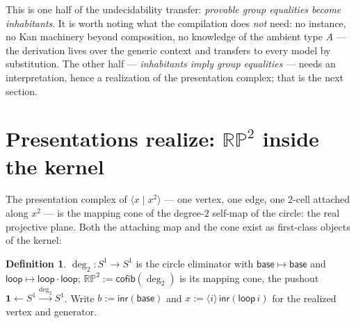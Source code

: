 \documentclass[11pt]{amsart}
\theoremstyle{definition}
\newtheorem{defi}[thm]{Definition}
\newcommand{\trns}{\mathbin{\cdot}}
\newcommand{\RP}{\mathbb{RP}^2}
\newcommand{\Sone}{S^1}
\begin{document}
This is one half of the undecidability transfer: \emph{provable
group equalities become inhabitants}.  It is worth noting what the
compilation does \emph{not} need: no instance, no Kan machinery
beyond composition, no knowledge of the ambient type $A$ --- the
derivation lives over the generic context and transfers to every
model by substitution.  The other half --- \emph{inhabitants imply
group equalities} --- needs an interpretation, hence a realization
of the presentation complex; that is the next section.

\section{Presentations realize: $\RP$ inside the kernel}
\label{sec:present}

The presentation complex of $\langle x \mid x^2 \rangle$ --- one
vertex, one edge, one $2$-cell attached along $x^2$ --- is the
mapping cone of the degree-$2$ self-map of the circle: the real
projective plane.  Both the attaching map and the cone exist as
first-class objects of the kernel:

\begin{defi}
  \label{def:rp2}
  $\deg_2 : \Sone \to \Sone$ is the circle eliminator with
  $\mathsf{base} \mapsto \mathsf{base}$ and $\mathsf{loop} \mapsto
  \mathsf{loop} \trns \mathsf{loop}$;
  $\RP := \mathsf{cofib}(\deg_2)$ is its mapping cone, the pushout
  $\mathbf{1} \leftarrow \Sone \xrightarrow{\deg_2} \Sone$.  Write
  $b := \mathsf{inr}(\mathsf{base})$ and
  $x := \langle i \rangle\, \mathsf{inr}(\mathsf{loop}\,i)$ for the
  realized vertex and generator.
\end{defi}
\end{document}
